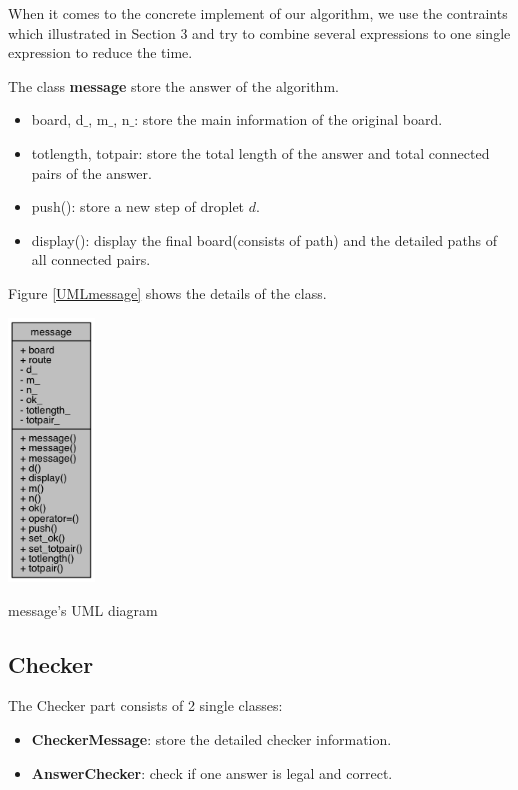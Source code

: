 \documentclass[twocolumn]{article}
\begin{document}
When it comes to the concrete implement of our algorithm, we use the contraints which illustrated in Section 3 and try to combine several expressions to one single expression to reduce the time.

The class \textbf{message} store the answer of the algorithm. 

\begin{itemize}
    \item board, d$\_$, m$\_$, n$\_$: store the main information of the original board.
    \item totlength, totpair: store the total length of the answer and total connected pairs of the answer.
    \item push(): store a new step of droplet $d$.
    \item display(): display the final board(consists of path) and the detailed paths of all connected pairs.
\end{itemize}

Figure \ref{UMLmessage} shows the details of the class.

\begin{center}
\makeatletter
\def\@captype{figure}
\makeatother
\includegraphics [height=7cm]{UMLmessage}
\caption{message's UML diagram}
\label{UMLmessage}
\end{center}


\subsection{Checker}

The Checker part consists of 2 single classes:

\begin{itemize}
    \item \textbf{CheckerMessage}: store the detailed checker information.
    \item \textbf{AnswerChecker}: check if one answer is legal and correct.
\end{itemize}
\end{document}
